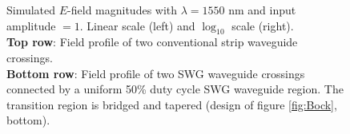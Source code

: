 \documentclass[aps,prl,twocolumn, superscriptaddress]{revtex4}
\begin{document}
\begin{figure}[htbp]
    \caption{Simulated $E$-field magnitudes with $\lambda = 1550$ nm and input amplitude $=1$. Linear scale (left) and $\log_{10}$ scale (right). \\ \textbf{Top row}: Field profile of two conventional strip waveguide crossings. \\
    \textbf{Bottom row}: Field profile of two SWG waveguide crossings connected by a uniform 50\% duty cycle SWG waveguide region. The transition region is bridged and tapered (design of figure \ref{fig:Bock}, bottom). }
    \label{fig:LumericalResultsDouble}
\end{figure}
\end{document}
